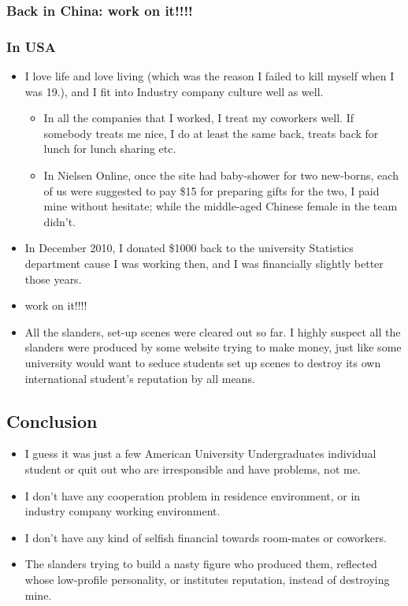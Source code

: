 \documentclass[9pt,b5paper]{article}
\begin{document}
\subsubsection{Back in China: work on it!!!!}
\label{sec-3-3-1}
\subsubsection{In USA}
\label{sec-3-3-2}
\begin{itemize}
\item I love life and love living (which was the reason I failed to kill myself when I was 19.), and I fit into Industry company culture well as well.
\begin{itemize}
\item In all the companies that I worked, I treat my coworkers well. If somebody treats me nice, I do at least the same back, treats back for lunch for lunch sharing etc.
\item In Nielsen Online, once the site had baby-shower for two new-borns, each of us were suggested to pay \$15 for preparing gifts for the two, I paid mine without hesitate; while the middle-aged Chinese female in the team didn't.
\end{itemize}
\item In December 2010, I donated \$1000 back to the university Statistics department cause I was working then, and I was financially slightly better those years.
\item work on it!!!!
\item All the slanders, set-up scenes were cleared out so far. I highly suspect all the slanders were produced by some website trying to make money, just like some university would want to seduce students set up scenes to destroy its own international student's reputation by all means.
\end{itemize}
\subsection{Conclusion}
\label{sec-3-4}
\begin{itemize}
\item I guess it was just a few American University Undergraduates individual student or quit out who are irresponsible and have problems, not me.
\item I don't have any cooperation problem in residence environment, or in industry company working environment.
\item I don't have any kind of selfish financial towards room-mates or coworkers.
\item The slanders trying to build a nasty figure who produced them, reflected whose low-profile personality, or institutes reputation, instead of destroying mine.
\end{itemize}
\end{document}
